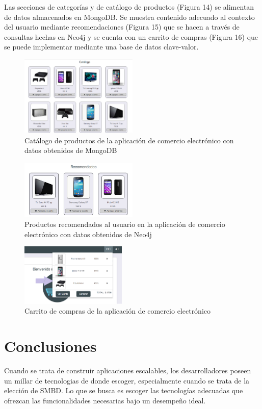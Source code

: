 \documentclass[conference]{IEEEtran}
\begin{document}
Las secciones de categor\'ias y de cat\'alogo de productos (Figura 14) se alimentan de datos almacenados en MongoDB. Se muestra contenido adecuado al contexto del usuario mediante recomendaciones (Figura 15) que se hacen a trav\'es de consultas hechas en Neo4j y se cuenta con un carrito de compras (Figura 16) que se puede implementar mediante una base de datos clave-valor.

\begin{figure}[!h]
\centering
\includegraphics[width=0.5\textwidth]{14}
\caption{Cat\'alogo de productos de la aplicaci\'on de comercio electr\'onico con datos obtenidos de MongoDB}
\label{}
\end{figure}

\begin{figure}[!h]
\centering
\includegraphics[width=0.5\textwidth]{15}
\caption{Productos recomendados al usuario en la aplicaci\'on de comercio electr\'onico con datos obtenidos de Neo4j}
\label{}
\end{figure}

\begin{figure}[!h]
\centering
\includegraphics[width=0.45\textwidth]{16}
\caption{Carrito de compras de la aplicaci\'on de comercio electr\'onico}
\label{}
\end{figure}


\section{Conclusiones}
  Cuando se trata de construir aplicaciones escalables, los desarrolladores poseen un millar de tecnologias de donde escoger, especialmente cuando se trata de la elecci\'on de SMBD. Lo que se busca es escoger las tecnolog\'ias adecuadas que ofrezcan las funcionalidades necesarias bajo un desempeño ideal.
\end{document}
